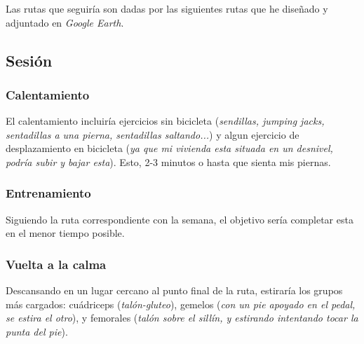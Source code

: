 \documentclass{article}
\begin{document}
Las rutas que seguiría son dadas por las siguientes rutas que he diseñado y adjuntado en \textit{Google Earth}.

\subsection{Sesión}

\subsubsection{Calentamiento}

El calentamiento incluiría ejercicios sin bicicleta (\textit{sendillas, jumping jacks, sentadillas a una pierna, sentadillas saltando...}) y algun ejercicio de desplazamiento en 
bicicleta (\textit{ya que mi vivienda esta situada en un desnivel, podría subir y bajar esta}). Esto, 2-3 minutos o hasta que sienta mis piernas.

\subsubsection{Entrenamiento}

Siguiendo la ruta correspondiente con la semana, el objetivo sería completar esta en el menor tiempo posible.

\subsubsection{Vuelta a la calma}

Descansando en un lugar cercano al punto final de la ruta, estiraría los grupos más cargados: cuádriceps (\textit{talón-gluteo}), gemelos 
(\textit{con un pie apoyado en el pedal, se estira el otro}), y femorales (\textit{talón sobre el sillín, y estirando intentando tocar la punta del pie}).
\end{document}
